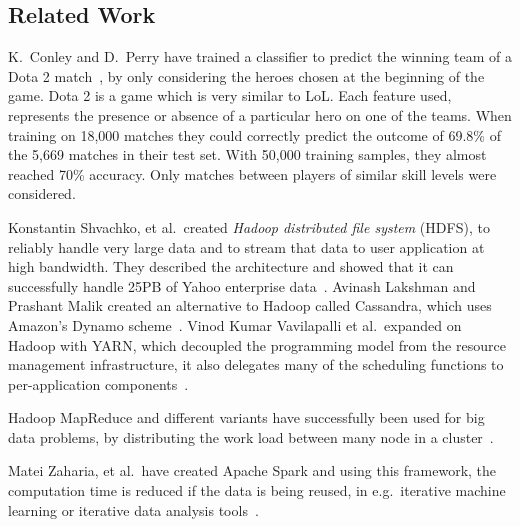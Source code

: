 \subsection{Related Work}\label{sec:mlandonlinevideogames}
K.\ Conley and D.\ Perry have trained a classifier to predict the winning team of a Dota 2 match~\cite{dota2article}, by only considering the heroes chosen at the beginning of the game. Dota 2 is a game which is very similar to LoL.\@
Each feature used, represents the presence or absence of a particular hero on one of the teams.
When training on 18,000 matches they could correctly predict the outcome of 69.8\% of the 5,669 matches in their test set.
With 50,000 training samples, they almost reached 70\% accuracy. Only matches between players of similar skill levels were considered.

Konstantin Shvachko, et al.\, created \emph{Hadoop distributed file system} (HDFS), to reliably handle very large data and to stream that data to user application at high bandwidth. They described the architecture and showed that it can successfully handle 25PB of Yahoo enterprise data~\cite{HDFS}.
Avinash Lakshman and Prashant Malik created an alternative to Hadoop called Cassandra, which uses Amazon's Dynamo scheme~\cite{ApacheCassandra}.
Vinod Kumar Vavilapalli et al.\ expanded on Hadoop with YARN, which decoupled the programming model from the resource management infrastructure, it also delegates many of the scheduling functions to per-application components~\cite{ApacheHadoopYARN}.

Hadoop MapReduce and different variants have successfully been used for big data problems, by distributing the work load between many node in a cluster~\cite{DeanMapReduce}. 

Matei Zaharia, et al.\ have created Apache Spark and using this framework, the computation time is reduced if the data is being reused, in e.g.\ iterative machine learning or iterative data analysis tools~\cite{ApacheSpark}.



